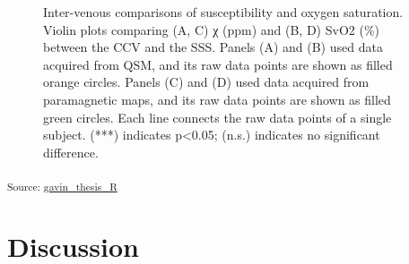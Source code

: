 \documentclass[
sn-nature
]{sn-jnl}
\begin{document}
\begin{figure}[H]


\caption{\label{fig-regionplot}Inter-venous comparisons of
susceptibility and oxygen saturation. Violin plots comparing (A, C) χ
(ppm) and (B, D) SvO2 (\%) between the CCV and the SSS. Panels (A) and
(B) used data acquired from QSM, and its raw data points are shown as
filled orange circles. Panels (C) and (D) used data acquired from
paramagnetic maps, and its raw data points are shown as filled green
circles. Each line connects the raw data points of a single subject.
(***) indicates p\textless0.05; (n.s.) indicates no significant
difference.}

\end{figure}%

\textsubscript{Source:
\href{https://WeberLab.github.io/Chisep_CSVO2_Manuscript/notebooks/gavin_thesis_markdown-preview.html\#cell-fig-regionplot}{gavin\_thesis\_R}}

\section{Discussion}\label{sec-discussion}
\end{document}
